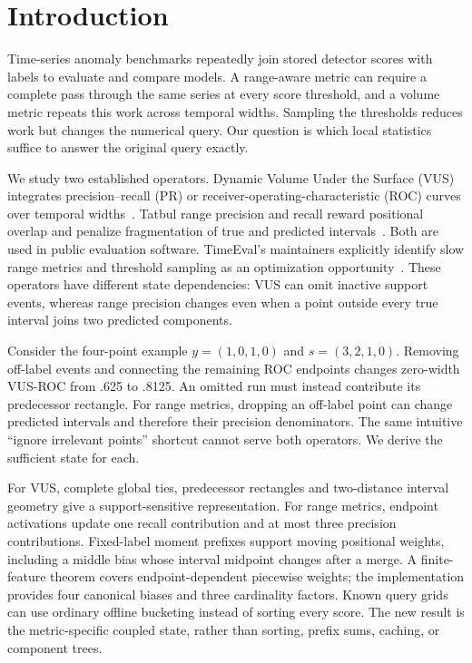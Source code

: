 \section{Introduction}
Time-series anomaly benchmarks repeatedly join stored detector scores with
labels to evaluate and compare models. A range-aware metric can require a
complete pass through the same series at every score threshold, and a volume
metric repeats this work across temporal widths. Sampling the thresholds
reduces work but changes the numerical query. Our question is which local
statistics suffice to answer the original query exactly.

We study two established operators. Dynamic Volume Under the Surface
(VUS) integrates precision--recall (PR) or receiver-operating-characteristic
(ROC) curves over temporal widths~\cite{paparrizos2022,boniol2025}. Tatbul range
precision and recall reward positional overlap and penalize fragmentation of
true and predicted intervals~\cite{tatbul2018}. Both are used in public
evaluation software. TimeEval's maintainers explicitly identify slow range
metrics and threshold sampling as an optimization opportunity~\cite{timeevalrangeissue}.
These operators have different state dependencies: VUS can omit inactive
support events, whereas range precision changes even when a point outside
every true interval joins two predicted components.

Consider the four-point example $y=(1,0,1,0)$ and $s=(3,2,1,0)$.
Removing off-label events and connecting the remaining ROC endpoints changes
zero-width VUS-ROC from .625 to .8125. An omitted run must instead contribute
its predecessor rectangle. For range metrics, dropping an off-label point can
change predicted intervals and therefore their precision denominators. The
same intuitive ``ignore irrelevant points'' shortcut cannot serve both
operators. We derive the sufficient state for each.

For VUS, complete global ties, predecessor rectangles and two-distance
interval geometry give a support-sensitive representation. For range metrics,
endpoint activations update one recall contribution and at most three precision
contributions. Fixed-label moment prefixes support moving positional weights,
including a middle bias whose interval midpoint changes after a merge. A
finite-feature theorem covers endpoint-dependent piecewise weights; the
implementation provides four canonical biases and three cardinality factors.
Known query grids can use ordinary offline bucketing instead of sorting every
score. The new result is the metric-specific coupled state, rather than
sorting, prefix sums, caching, or component trees.


